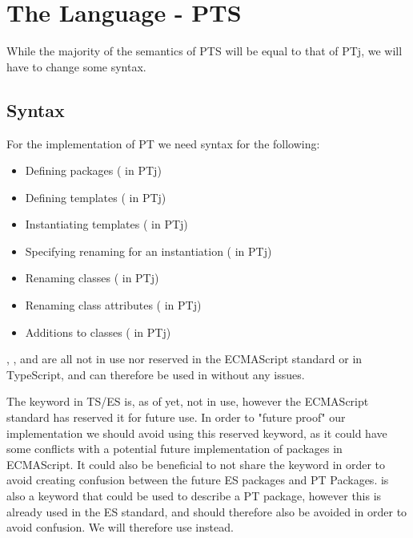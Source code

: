 \chapter{The Language - PTS}\label{ch:the-language---pts}

While the majority of the semantics of PTS will be equal to that of PTj, we will have to change some syntax.

\section{Syntax}\label{sec:syntax}

For the implementation of PT we need syntax for the following:

\begin{itemize}
    \item Defining packages ( in PTj)
    \item Defining templates ( in PTj)
    \item Instantiating templates ( in PTj)
    \item Specifying renaming for an instantiation ( in PTj)
    \item Renaming classes (\codeword{=>} in PTj)
    \item Renaming class attributes (\codeword{->} in PTj)
    \item Additions to classes ( in PTj)
\end{itemize}

, , and  are all not in use nor reserved in the ECMAScript standard or in TypeScript, and can therefore be used in \plname{} without any issues.

The keyword  in TS/ES is, as of yet, not in use, however the ECMAScript standard has reserved it for future use.
In order to "future proof" our implementation we should avoid using this reserved keyword, as it could have some conflicts with a potential future implementation of packages in ECMAScript.
It could also be beneficial to not share the keyword in order to avoid creating confusion between the future ES packages and PT Packages.
 is also a keyword that could be used to describe a PT package, however this is already used in the ES standard, and should therefore also be avoided in order to avoid confusion.
We will therefore use  instead.

